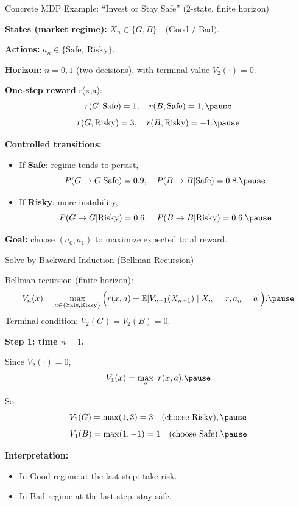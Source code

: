 \documentclass[aspectratio=169]{beamer}
\begin{document}
\begin{frame}{Concrete MDP Example: ``Invest or Stay Safe'' (2-state, finite horizon)}

\textbf{States (market regime):}
$
X_n\in\{G,B\}\quad\text{(Good / Bad)}.
$\pause

\textbf{Actions:}
$
a_n\in\{\text{Safe},\ \text{Risky}\}.
$\pause

\textbf{Horizon:} $n=0,1$ (two decisions), with terminal value $V_2(\cdot)=0$.\pause

\medskip
\textbf{One-step reward } r(x,a):
\vspace{-5mm}
\[
r(G,\text{Safe})=1,\quad r(B,\text{Safe})=1,\pause
\vspace{-5mm}
\]
\[
r(G,\text{Risky})=3,\quad r(B,\text{Risky})=-1.\pause
\vspace{-7mm}
\]

\textbf{Controlled transitions:}
\begin{itemize}
  \item If \textbf{Safe}: regime tends to persist,
  \[
  P(G\to G|\text{Safe})=0.9,\quad P(B\to B|\text{Safe})=0.8.
  \vspace{-4mm}\pause
  \]
  \item If \textbf{Risky}: more instability,
  \[
  P(G\to G|\text{Risky})=0.6,\quad P(B\to B|\text{Risky})=0.6.
  \vspace{-4mm}\pause
  \]
\end{itemize}

\medskip
\textbf{Goal:} choose $(a_0,a_1)$ to maximize expected total reward.
\end{frame}

\begin{frame}{Solve by Backward Induction (Bellman Recursion)}

Bellman recursion (finite horizon):
\[
V_n(x)=\max_{a\in\{\text{Safe},\text{Risky}\}}
\Big(r(x,a)+\mathbb{E}[V_{n+1}(X_{n+1})\mid X_n=x,a_n=a]\Big).\pause
\]
Terminal condition: $V_2(G)=V_2(B)=0$.

\textbf{Step 1: time $n=1$.}

Since $V_2(\cdot)=0$,
\[
V_1(x)=\max_{a}\ r(x,a).\pause
\vspace{-5mm}
\]

So:
\vspace{-5mm}
\[
V_1(G)=\max(1,3)=3\quad(\text{choose Risky}),\pause
\vspace{-5mm}
\]
\[
V_1(B)=\max(1,-1)=1\quad(\text{choose Safe}).\pause
\vspace{-7mm}
\]

\textbf{Interpretation:}
\begin{itemize}
  \item In Good regime at the last step: take risk.\pause
  \item In Bad regime at the last step: stay safe.
\end{itemize}
\end{frame}
\end{document}
